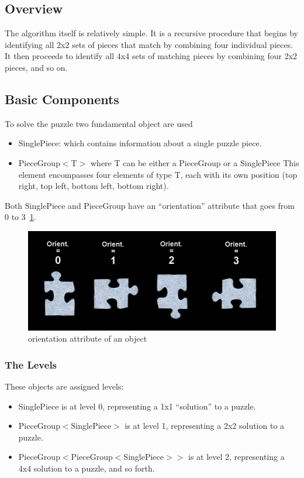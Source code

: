 \documentclass{article}
\begin{document}
\subsection{Overview}
The algorithm itself is relatively simple.
It is a recursive procedure that begins by identifying all 2x2 sets of pieces that match by combining four individual pieces.
It then proceeds to identify all 4x4 sets of matching pieces by combining four 2x2 pieces, and so on.\newline

\subsection{Basic Components}
To solve the puzzle two fundamental object are used
\begin{itemize}
  \item SinglePiece: which contains information about a single puzzle piece.
  \item PieceGroup\(<\)T\(>\) where T can be either a PieceGroup or a SinglePiece\newline
  This element encompasses four elements of type T, each with its own position (top right, top left, bottom left, bottom right).
\end{itemize}
Both SinglePiece and PieceGroup have an ``orientation'' attribute that goes from 0 to 3~\ref{fig:orientation}.
\begin{figure}[H]
  \caption{orientation attribute of an object}\label{fig:orientation}
  \centering
  \includegraphics[height=0.3\textwidth]{pictures/orientation.png}
\end{figure}

\subsubsection{The Levels}

These objects are assigned levels:
\begin{itemize}
\item SinglePiece is at level 0, representing a 1x1 ``solution'' to a puzzle.
\item PieceGroup\(<\)SinglePiece\(>\) is at level 1, representing a 2x2 solution to a puzzle.
\item PieceGroup\(<\)PieceGroup\(<\)SinglePiece\(>>\) is at level 2, representing a 4x4 solution to a puzzle, and so forth.
\end{itemize}
\end{document}
